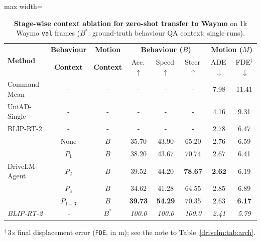 \begin{table}[t]
  \centering
  \caption[Stage-wise context ablation for zero-shot transfer to Waymo]{\textbf{Stage-wise context ablation for zero-shot transfer to Waymo} on 1k Waymo \texttt{val} frames ($B^{*}$: ground-truth behaviour QA context; single runs).}
  \label{drivelm:tab:waymo_supp}
  \begin{adjustbox}{max width=\textwidth}
  \begin{tabular}{l|cc|ccc|cc}
    \toprule
    \multirow{2}{*}{\textbf{Method}} & \textbf{Behaviour} & \textbf{Motion} & \multicolumn{3}{c|}{\textbf{Behaviour ($B$)}} & \multicolumn{2}{c}{\textbf{Motion ($M$)}} \\
    & \textbf{Context} & \textbf{Context} & Acc.\,$\uparrow$ & Speed\,$\uparrow$ & Steer\,$\uparrow$ & ADE\,$\downarrow$ & FDE$^{\dagger}$\,$\downarrow$ \\
    \midrule
    Command Mean & - & - & - & - & - & 7.98 & 11.41 \\
    UniAD-Single & - & - & - & - & - & 4.16 & 9.31 \\
    BLIP-RT-2 & - & - & - & - & - & 2.78 & 6.47 \\
    \midrule
    & None & $B$ & 35.70 & 43.90 & 65.20 & 2.76 & 6.59 \\
    & $P_1$ & $B$ & 38.20 & 43.67 & 70.74 & 2.67 & 6.41 \\
    DriveLM-Agent & $P_2$ & $B$ & 39.52 & 44.20 & \textbf{78.67} & \textbf{2.62} & 6.19 \\
    & $P_3$ & $B$ & 34.62 & 41.28 & 64.55 & 2.85 & 6.89 \\
    & $P_{1-3}$ & $B$ & \textbf{39.73} & \textbf{54.29} & 70.35 & 2.63 & \textbf{6.17} \\
    \midrule
    \textit{BLIP-RT-2} & \textit{-} & $B^{*}$ & \textit{100.0} & \textit{100.0} & \textit{100.0} & \textit{2.41} & \textit{5.79} \\
    \bottomrule
  \end{tabular}
  \end{adjustbox}
  \par\smallskip
  {\linespread{1.1}\footnotesize\raggedright
  $^{\dagger}$\,3\,s final displacement error (\texttt{FDE}, in m); see the note to Table~\ref{drivelm:tab:arch}.\par}
\end{table}

